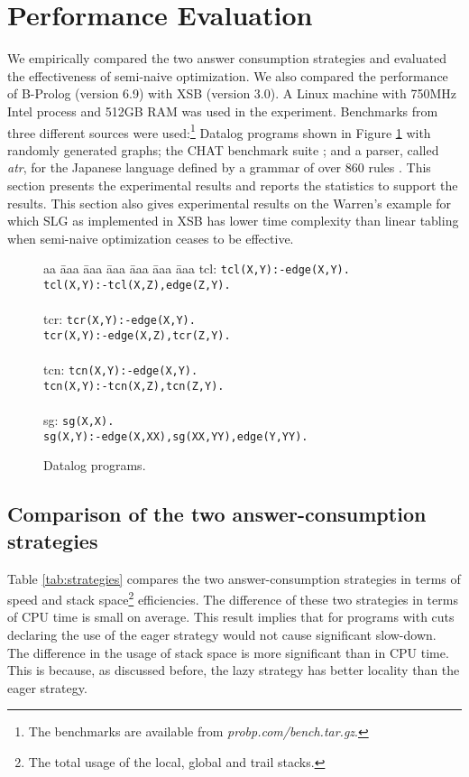 \documentclass{tlp}
\begin{document}
\section{Performance Evaluation}
We empirically compared the two answer consumption strategies and evaluated the effectiveness of semi-naive optimization. We also compared the performance of B-Prolog (version 6.9) with XSB (version 3.0). A Linux machine with 750MHz Intel process and 512GB RAM was used in the experiment. Benchmarks from three different sources were used:\footnote{The benchmarks are available from {\it probp.com/bench.tar.gz}.} Datalog programs shown in Figure \ref{fig:datalog} with randomly generated graphs; the CHAT benchmark suite \cite{Demoen99}; and a parser, called {\it atr}, for the Japanese language defined by a grammar of over 860 rules \cite{Uratani94}.  This section presents the experimental results and reports the statistics to support the results. This section also gives experimental results on the Warren's example for which SLG as implemented in XSB has lower time complexity than linear tabling when semi-naive optimization ceases to be effective.

\begin{figure}[t]
\begin{center}
\begin{tabbing}
aa \= aaa \= aaa \= aaa \= aaa \= aaa \= aaa \kill
tcl: \> \> {\tt tcl(X,Y):-edge(X,Y).} \\
\> \> {\tt tcl(X,Y):-tcl(X,Z),edge(Z,Y).} \\
\\
tcr: \> \> {\tt tcr(X,Y):-edge(X,Y).} \\
\> \> {\tt tcr(X,Y):-edge(X,Z),tcr(Z,Y).} \\
\\
tcn: \> \> {\tt tcn(X,Y):-edge(X,Y).} \\
\> \> {\tt tcn(X,Y):-tcn(X,Z),tcn(Z,Y).} \\
\\
sg: \> \> {\tt sg(X,X).} \\
\> \> {\tt sg(X,Y):-edge(X,XX),sg(XX,YY),edge(Y,YY).} 
\end{tabbing}
\end{center}
\caption{\label{fig:datalog}Datalog programs.}
\end{figure}

\subsection{Comparison of the two answer-consumption strategies}
Table \ref{tab:strategies} compares the two answer-consumption strategies in terms of speed and stack space\footnote{The total usage of the local, global and trail stacks.} efficiencies. The difference of these two strategies in terms of CPU time is small on average. This result implies that for programs with cuts declaring the use of the eager strategy would not cause significant slow-down. The difference in the usage of stack space is more significant than in CPU time. This is because, as discussed before, the lazy strategy has better locality than the eager strategy.
\end{document}
